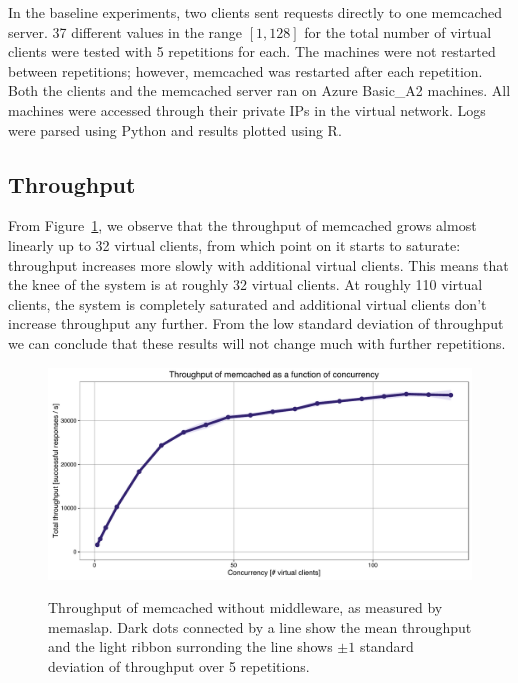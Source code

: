 \documentclass[11pt]{article}
\begin{document}
In the baseline experiments, two clients sent requests directly to one memcached server. 37 different values in the range $[1, 128]$ for the total number of virtual clients were tested with 5 repetitions for each. The machines were not restarted between repetitions; however, memcached was restarted after each repetition. Both the clients and the memcached server ran on Azure Basic\_A2 machines. All machines were accessed through their private IPs in the virtual network. Logs were parsed using Python and results plotted using R.



\subsection{Throughput}\label{sec:baseline:tput}

From Figure~\ref{fig:baseline:throughput}, we observe that the throughput of memcached grows almost linearly up to 32 virtual clients, from which point on it starts to saturate: throughput increases more slowly with additional virtual clients. This means that the knee of the system is at roughly 32 virtual clients. At roughly 110 virtual clients, the system is completely saturated and additional virtual clients don't increase throughput any further. From the low standard deviation of throughput we can conclude that these results will not change much with further repetitions.

\begin{figure}[p]
\centering
\includegraphics[width=\textwidth]{../results/baseline/graphs/throughput.pdf}
\label{fig:baseline:throughput}
\caption{Throughput of memcached without middleware, as measured by memaslap. Dark dots connected by a line show the mean throughput and the light ribbon surronding the line shows $\pm 1$ standard deviation of throughput over 5 repetitions.}
\end{figure}
\end{document}
